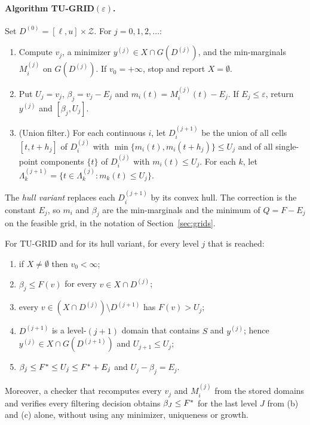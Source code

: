 \paragraph{Algorithm TU-GRID$(\varepsilon)$.}
Set $D^{(0)}=[\ell,u]\times\mathcal Z$. For $j=0,1,2,\dots$:
\begin{enumerate}[label=(\arabic*)]
\item Compute $v_j$, a minimizer $y^{(j)}\in X\cap G(D^{(j)})$, and the
min-marginals $M^{(j)}_i$ on $G(D^{(j)})$. If $v_0=+\infty$, stop and report
$X=\emptyset$.
\item Put $U_j=v_j$, $\beta_j=v_j-E_j$ and $m_i(t)=M^{(j)}_i(t)-E_j$. If
$E_j\le\varepsilon$, return $y^{(j)}$ and $[\beta_j,U_j]$.
\item (Union filter.) For each continuous $i$, let $D^{(j+1)}_i$ be the union
of all cells $[t,t+h_j]$ of $D^{(j)}_i$ with
$\min\{m_i(t),m_i(t+h_j)\}\le U_j$ and of all single-point components
$\{t\}$ of $D^{(j)}_i$ with $m_i(t)\le U_j$. For each $k$, let
$\Lambda^{(j+1)}_k=\{t\in\Lambda^{(j)}_k:m_{k}(t)\le U_j\}$.
\end{enumerate}
The \emph{hull variant} replaces each $D^{(j+1)}_i$ by its convex hull. The
correction is the constant $E_j$, so $m_i$ and $\beta_j$ are the min-marginals
and the minimum of $Q=F-E_j$ on the feasible grid, in the notation of
Section~\ref{sec:grids}.

\begin{proposition}[Soundness]\label{prop:tu-sound}
For TU-GRID and for its hull variant, for every level $j$ that is reached:
\begin{enumerate}[label=(\alph*)]
\item if $X\ne\emptyset$ then $v_0<\infty$;
\item $\beta_j\le F(v)$ for every $v\in X\cap D^{(j)}$;
\item every $v\in(X\cap D^{(j)})\setminus D^{(j+1)}$ has $F(v)>U_j$;
\item $D^{(j+1)}$ is a level-$(j+1)$ domain that contains $S$ and $y^{(j)}$;
hence $y^{(j)}\in X\cap G(D^{(j+1)})$ and $U_{j+1}\le U_j$;
\item $\beta_j\le F^*\le U_j\le F^*+E_j$ and $U_j-\beta_j=E_j$.
\end{enumerate}
Moreover, a checker that recomputes every $v_j$ and $M^{(j)}_i$ from the
stored domains and verifies every filtering decision obtains
$\beta_J\le F^*$ for the last level $J$ from (b) and (c) alone, without
using any minimizer, uniqueness or growth.
\end{proposition}

